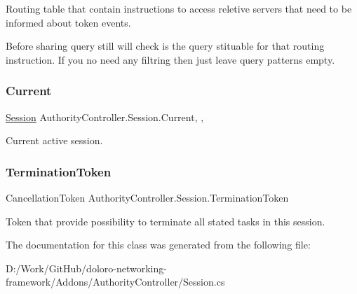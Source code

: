 Routing table that contain instructions to access reletive servers that need to be informed about token events. 

Before sharing query still will check is the query stituable for that routing instruction. If you no need any filtring then just leave query patterns empty. \mbox{\label{class_authority_controller_1_1_session_a20d84345a3843b7a1b340887bb961f7c}} 
\subsubsection{\texorpdfstring{Current}{Current}}
{\footnotesize\ttfamily \mbox{\hyperlink{class_authority_controller_1_1_session}{Session}} Authority\+Controller.\+Session.\+Current\hspace{0.3cm}{\ttfamily [static]}, {\ttfamily [get]}, {\ttfamily [set]}}



Current active session. 

\mbox{\label{class_authority_controller_1_1_session_a531bf4c153a454ac5236366a1e684619}} 
\subsubsection{\texorpdfstring{Termination\+Token}{TerminationToken}}
{\footnotesize\ttfamily Cancellation\+Token Authority\+Controller.\+Session.\+Termination\+Token\hspace{0.3cm}{\ttfamily [get]}}



Token that provide possibility to terminate all stated tasks in this session. 



The documentation for this class was generated from the following file\+:\begin{DoxyCompactItemize}
\item 
D\+:/\+Work/\+Git\+Hub/doloro-\/networking-\/framework/\+Addons/\+Authority\+Controller/Session.\+cs\end{DoxyCompactItemize}
